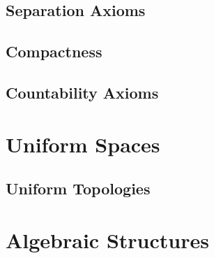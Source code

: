 \subsection{Separation Axioms}


\subsection{Compactness}
\subsection{Countability  Axioms}







\section{Uniform Spaces}







\subsection{Uniform Topologies}





\section{Algebraic Structures}
